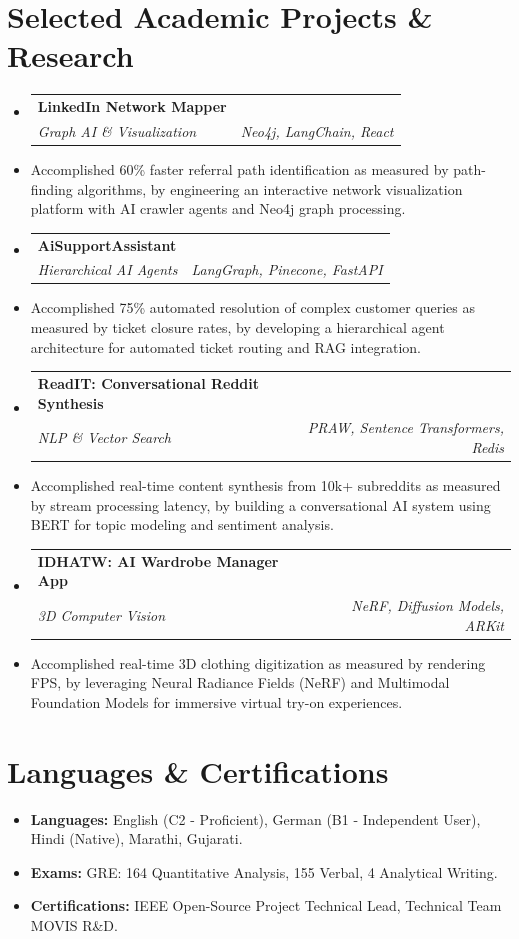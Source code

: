 \documentclass[10pt, a4paper]{article}
\makeatletter
\newcommand{\resumeItem}[1]{\item\small{#1}}
\newcommand{\resumeHeading}[4]{
  \vspace{-1pt}\item
    \begin{tabular*}{0.97\textwidth}[t]{l@{\extracolsep{\fill}}r}
      \textbf{#1} & #2 \\
      \textit{\small#3} & \textit{\small #4} \\
    \end{tabular*}\vspace{-5pt}
}
\makeatother
\begin{document}
\section{Selected Academic Projects \& Research}
\begin{itemize}[leftmargin=0.15in, label={}]
    \resumeHeading
      {LinkedIn Network Mapper}{}
      {Graph AI \& Visualization}{Neo4j, LangChain, React}
      \resumeItem{Accomplished 60\% faster referral path identification as measured by path-finding algorithms, by engineering an interactive network visualization platform with AI crawler agents and Neo4j graph processing.}
    
    \resumeHeading
      {AiSupportAssistant}{}
      {Hierarchical AI Agents}{LangGraph, Pinecone, FastAPI}
      \resumeItem{Accomplished 75\% automated resolution of complex customer queries as measured by ticket closure rates, by developing a hierarchical agent architecture for automated ticket routing and RAG integration.}

    \resumeHeading
      {ReadIT: Conversational Reddit Synthesis}{}
      {NLP \& Vector Search}{PRAW, Sentence Transformers, Redis}
      \resumeItem{Accomplished real-time content synthesis from 10k+ subreddits as measured by stream processing latency, by building a conversational AI system using BERT for topic modeling and sentiment analysis.}

    \resumeHeading
      {IDHATW: AI Wardrobe Manager App}{}
      {3D Computer Vision}{NeRF, Diffusion Models, ARKit}
      \resumeItem{Accomplished real-time 3D clothing digitization as measured by rendering FPS, by leveraging Neural Radiance Fields (NeRF) and Multimodal Foundation Models for immersive virtual try-on experiences.}
\end{itemize}

\section{Languages \& Certifications}
\begin{itemize}[leftmargin=0.15in, label={}]
    \item \textbf{Languages:} English (C2 - Proficient), German (B1 - Independent User), Hindi (Native), Marathi, Gujarati.
    \item \textbf{Exams:} GRE: 164 Quantitative Analysis, 155 Verbal, 4 Analytical Writing.
    \item \textbf{Certifications:} IEEE Open-Source Project Technical Lead, Technical Team MOVIS R\&D.
\end{itemize}
\end{document}
